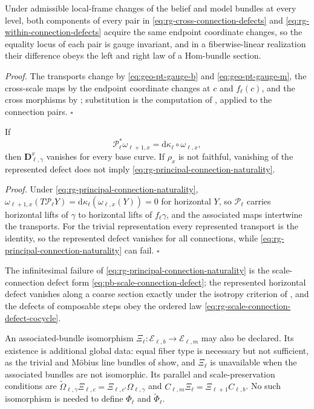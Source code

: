 Under admissible local-frame changes of the belief and model bundles at every level, both components
of every pair in \eqref{eq:rg-cross-connection-defects} and \eqref{eq:rg-within-connection-defects}
acquire the same endpoint coordinate changes, so the equality locus of each pair is gauge invariant,
and in a fiberwise-linear realization their difference obeys the left and right law of a Hom-bundle
section. 

\noindent\emph{Proof.}
The transports change by \eqref{eq:geo-pt-gauge-b} and \eqref{eq:geo-pt-gauge-m}, the cross-scale
maps by the endpoint coordinate changes at \(c\) and \(f_\ell(c)\), and the cross morphisms by
; substitution is the computation of
, applied to the connection pairs. \hfill$\square$

If
\begin{equation}
\mathcal P_\ell^*\omega_{\ell+1,x}
=\mathrm d\kappa_\ell\circ\omega_{\ell,x},
\label{eq:rg-principal-connection-naturality}
\end{equation}
then \(\mathbf D^x_{\ell,\gamma}\) vanishes for every base curve. If \(\rho_x\) is not faithful,
vanishing of the represented defect does not imply \eqref{eq:rg-principal-connection-naturality}.

\noindent\emph{Proof.}
Under \eqref{eq:rg-principal-connection-naturality},
\(\omega_{\ell+1,x}(T\mathcal P_\ell Y)=\mathrm d\kappa_\ell(\omega_{\ell,x}(Y))=0\) for horizontal
\(Y\), so \(\mathcal P_\ell\) carries horizontal lifts of \(\gamma\) to horizontal lifts of
\(f_\ell\gamma\), and the associated maps intertwine the transports. For the trivial representation
every represented transport is the identity, so the represented defect vanishes for all connections,
while \eqref{eq:rg-principal-connection-naturality} can fail. \hfill$\square$

The infinitesimal failure of \eqref{eq:rg-principal-connection-naturality} is the scale-connection
defect form \eqref{eq:pb-scale-connection-defect}; the represented horizontal defect vanishes along a
coarse section exactly under the isotropy criterion of , and the
defects of composable steps obey the ordered law \eqref{eq:rg-scale-connection-defect-cocycle}.

An associated-bundle isomorphism \(\Xi_\ell:\mathcal E_{\ell,b}\to\mathcal E_{\ell,m}\) may also be
declared. Its existence is additional global data: equal fiber type is necessary but not sufficient,
as the trivial and M\"obius line bundles of  show, and \(\Xi_\ell\) is
unavailable when the associated bundles are not isomorphic. Its parallel and scale-preservation
conditions are \(\widetilde\Omega_{\ell,\gamma}\Xi_{\ell,c}=\Xi_{\ell,c'}\Omega_{\ell,\gamma}\) and
\(C_{\ell,m}\Xi_\ell=\Xi_{\ell+1}C_{\ell,b}\). No such isomorphism is needed to define
\(\Phi_\ell\) and \(\widetilde\Phi_\ell\).

